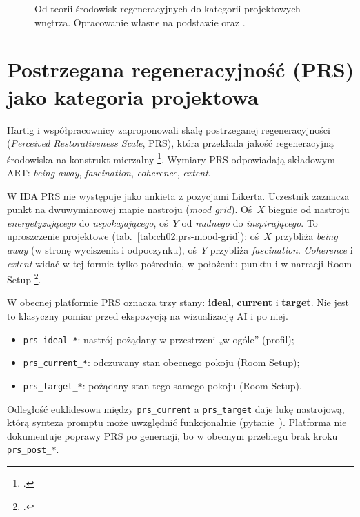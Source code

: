 \begin{figure}[htbp]
  \centering
  \caption[Od teorii środowisk regeneracyjnych do kategorii projektowych wnętrza. Opracowanie własne na podstawie Kaplana oraz Ulricha.]{Od teorii środowisk regeneracyjnych do kategorii projektowych wnętrza.
    Opracowanie własne na podstawie \textcite{kaplan1995restorative} oraz \textcite{ulrich1984window}.}
  \label{fig:ch02:restorative-framework}
\end{figure}

\section{Postrzegana regeneracyjność (PRS) jako kategoria projektowa}
\label{ch02:sec:prs}

Hartig i współpracownicy zaproponowali skalę postrzeganej regeneracyjności (\emph{Perceived Restorativeness Scale}, PRS), która przekłada jakość regeneracyjną środowiska na konstrukt mierzalny \footcite{hartig1997prs}.
Wymiary PRS odpowiadają składowym ART: \emph{being away}, \emph{fascination}, \emph{coherence}, \emph{extent}.

W IDA PRS nie występuje jako ankieta z pozycjami Likerta. Uczestnik zaznacza punkt na dwuwymiarowej mapie nastroju (\emph{mood grid}).
Oś~$X$ biegnie od nastroju \emph{energetyzującego} do \emph{uspokajającego}, oś~$Y$ od \emph{nudnego} do \emph{inspirującego}.
To uproszczenie projektowe (tab.~\ref{tab:ch02:prs-mood-grid}): oś~$X$ przybliża \emph{being away} (w stronę wyciszenia i odpoczynku), oś~$Y$ przybliża \emph{fascination}. \emph{Coherence} i \emph{extent} widać w tej formie tylko pośrednio, w położeniu punktu i w narracji Room Setup \footcite{idaPlatform2026}.

W obecnej platformie PRS oznacza trzy stany: \textbf{ideal}, \textbf{current} i \textbf{target}. Nie jest to klasyczny pomiar przed ekspozycją na wizualizację AI i po niej.
\begin{itemize}
  \item \texttt{prs\_ideal\_*}: nastrój pożądany w przestrzeni „w ogóle” (profil);
  \item \texttt{prs\_current\_*}: odczuwany stan obecnego pokoju (Room Setup);
  \item \texttt{prs\_target\_*}: pożądany stan tego samego pokoju (Room Setup).
\end{itemize}
Odległość euklidesowa między \texttt{prs\_current} a \texttt{prs\_target} daje lukę nastrojową, którą synteza promptu może uwzględnić funkcjonalnie (pytanie~).
Platforma nie dokumentuje poprawy PRS po generacji, bo w obecnym przebiegu brak kroku \texttt{prs\_post\_*}.

